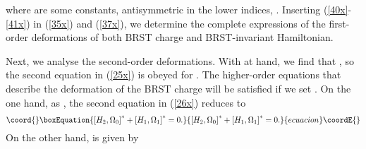 \documentclass[a4paper,12pt]{article}
\begin{document}
where \coordHE{} are some constants, antisymmetric in the lower
indices, \coordHE{}. Inserting (\ref{40x}-\ref{41x})
in (\ref{35x}) and (\ref{37x}), we determine the complete expressions of the
first-order deformations of both BRST charge and BRST-invariant Hamiltonian.

Next, we analyse the second-order deformations. With \coordHE{} at hand,
we find that \coordHE{}, so the second
equation in (\ref{25x}) is obeyed for \coordHE{}. The higher-order
equations that describe the deformation of the BRST charge will be satisfied
if we set \coordHE{}. On the one hand, as \coordHE{}, the second equation in (\ref{26x}) reduces to 
\begin{equation}\coord{}\boxEquation{
\left[ H_{2},\Omega _{0}\right] ^{*}+\left[ H_{1},\Omega _{1}\right] ^{*}=0.
\label{42x}
}{
\left[ H_{2},\Omega _{0}\right] ^{*}+\left[ H_{1},\Omega _{1}\right] ^{*}=0.
}{ecuacion}\coordE{}\end{equation}
On the other hand, \coordHE{} is given by 
\end{document}
